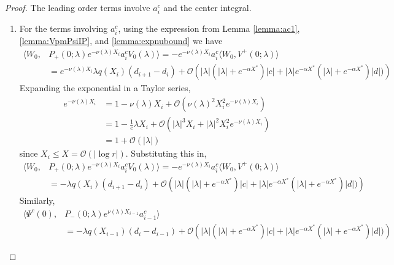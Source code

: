 \documentclass[thesis.tex]{subfiles}
\begin{document}
\begin{lemma}
\begin{proof}
The leading order terms involve $a_i^c$ and the center integral. 
\begin{enumerate}

\item For the terms involving $a_i^c$, using the expression from Lemma \ref{lemma:ac1}, \cref{lemma:VpmPsiIP}, and \cref{lemma:expnubound} we have
\begin{align*}
\langle W_0, &P_+(0; \lambda) e^{-\nu(\lambda)X_i} a_i^c V_0(\lambda) \rangle = -e^{-\nu(\lambda)X_i} a_i^c \langle W_0, V^+(0; \lambda) \rangle \\
&= e^{-\nu(\lambda)X_i} \lambda q(X_i) (d_{i+1} - d_i ) + \mathcal{O}\left( |\lambda| (|\lambda| + e^{-\alpha X^*})|c| + |\lambda| e^{-\alpha X^*}(|\lambda| + e^{-\alpha X^*}) |d|) \right)
\end{align*}
Expanding the exponential in a Taylor series,
\begin{align*}
e^{-\nu(\lambda)X_i} 
&= 1 - \nu(\lambda)X_i + \mathcal{O}( \nu(\lambda)^2 X_i^2 e^{-\nu(\lambda)X_i} ) \\
&= 1 - \frac{1}{c}\lambda X_i + \mathcal{O}(|\lambda|^3 X_i + |\lambda|^2 X_i^2 e^{-\nu(\lambda)X_i}) \\
&= 1 + \mathcal{O}(|\lambda|)
\end{align*}
since $X_i \leq X = \mathcal{O}(|\log r|)$. Substituting this in,
\begin{align*}
\langle W_0, &P_+(0; \lambda) e^{-\nu(\lambda)X_i} a_i^c V_0(\lambda) \rangle = -e^{-\nu(\lambda)X_i} a_i^c \langle W_0, V^+(0; \lambda) \rangle \\
&= -\lambda q(X_i) (d_{i+1} - d_i ) + \mathcal{O}\left( |\lambda| (|\lambda| + e^{-\alpha X^*})|c| + |\lambda| e^{-\alpha X^*}(|\lambda| + e^{-\alpha X^*}) |d|) \right)
\end{align*}
Similarly, 
\begin{align*}
\langle \Psi^c(0), &P_-(0; \lambda) e^{\nu(\lambda) X_{i-1}} a_{i-1}^c \rangle \\
&= -\lambda q(X_{i-1}) (d_i - d_{i-1} ) +\mathcal{O}\left( |\lambda|(|\lambda| + e^{-\alpha X^*})|c| + |\lambda| e^{-\alpha X^*}(|\lambda| + e^{-\alpha X^*}) |d|) \right)
\end{align*}


\end{enumerate}
\end{proof}
\end{lemma}
\end{document}
